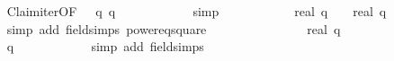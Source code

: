 \begin{isabellebody}
\ \ \ \ \ \ \ \ \isamarkupfalse%
\ Claim{}{\isacharunderscore}iter{\isacharprime}{\isacharbrackleft}OF\ {\isacharbackquoteopen}{}\ {\isasymle}\ q{\isacharbackquoteclose}\ {\isacharbackquoteopen}q\ {\isasymle}\ {}{}{}{}{\isacharbackquoteclose}{\isacharbrackright}\isanewline
\ \ \ \ \ \ \ \ \isamarkupfalse%
\ simp\isanewline
\ \ \ \ \ \ \isamarkupfalse%
\ \isamarkupfalse%
\ {\isachardoublequoteopen}{\isachardot}{\isachardot}{\isachardot}\ {\isacharequal}\ {\isacharparenleft}{\isacharparenleft}real\ q{\isacharcircum}{}\ {\isacharminus}\ {}{\isacharparenright}\ {\isacharslash}\ {\isacharparenleft}real\ q{\isacharparenright}\ {\isacharslash}\ {}{}{}{}{\isachardoublequoteclose}\isanewline
\ \ \ \ \ \ \ \ \isamarkupfalse%
\ {\isacharparenleft}simp\ add{\isacharcolon}\ field{\isacharunderscore}simps\ power{}{\isacharunderscore}eq{\isacharunderscore}square{\isacharparenright}\isanewline
\ \ \ \ \ \ \isamarkupfalse%
\ \isamarkupfalse%
\ {\isachardoublequoteopen}{\isachardot}{\isachardot}{\isachardot}\ {\isacharequal}\ {\isacharparenleft}{}\ {\isacharminus}\ {\isacharparenleft}{}\ {\isacharslash}\ {\isacharparenleft}real\ q{\isacharparenright}\ {\isacharslash}\ {}{}{}{}{\isachardoublequoteclose}\isanewline
\ \ \ \ \ \ \ \ \isamarkupfalse%
\ {\isacharbackquoteopen}q\ {\isasymge}\ {}{\isacharbackquoteclose}\isanewline
\ \ \ \ \ \ \ \ \isamarkupfalse%
\ {\isacharparenleft}simp\ add{\isacharcolon}\ field{\isacharunderscore}simps{\isacharparenright}\isanewline
\ \ \ \ \ \ \isamarkupfalse%
\ \isamarkupfalse%
\ {\isachardoublequoteopen}{\isachardot}{\isachardot}{\isachardot}\ {\isasymle}\ {\isacharparenleft}{}\ {\isacharminus}\ {\isacharparenleft}{}\ {\isacharslash}\ {}{}{}{}{\isacharcircum}{}{\isacharparenright}{\isacharparenright}\ {\isacharslash}\ {}{}{}{}{\isachardoublequoteclose}\isanewline
\ \ \ \ \ \ \isamarkupfalse%
{\isacharminus}\isanewline
\ \ \ \ \ \ \ \ \isamarkupfalse%

\end{isabellebody}
